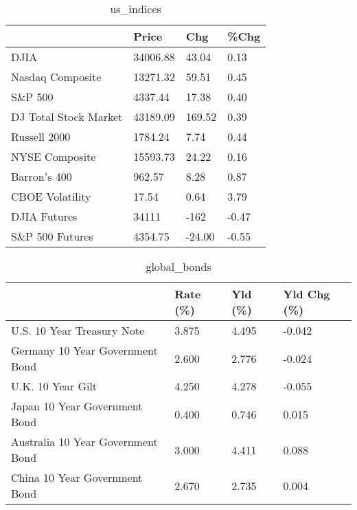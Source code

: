 \documentclass{article}%
\begin{document}
%


\begin{table}[htbp]%
\caption{us\_indices}%
\centering%
\begin{adjustbox}{width=1\textwidth}%
\begin{tabular}{llll}
\toprule
                      &    Price &    Chg &  \%Chg \\
\midrule
                 DJIA & 34006.88 &  43.04 &  0.13 \\
     Nasdaq Composite & 13271.32 &  59.51 &  0.45 \\
              S\&P 500 &  4337.44 &  17.38 &  0.40 \\
DJ Total Stock Market & 43189.09 & 169.52 &  0.39 \\
         Russell 2000 &  1784.24 &   7.74 &  0.44 \\
       NYSE Composite & 15593.73 &  24.22 &  0.16 \\
         Barron's 400 &   962.57 &   8.28 &  0.87 \\
      CBOE Volatility &    17.54 &   0.64 &  3.79 \\
         DJIA Futures &    34111 &   -162 & -0.47 \\
      S\&P 500 Futures &  4354.75 & -24.00 & -0.55 \\
\bottomrule
\end{tabular}
%
\end{adjustbox}%
\end{table}

%


\begin{table}[htbp]%
\caption{global\_bonds}%
\centering%
\begin{adjustbox}{width=1\textwidth}%
\begin{tabular}{llll}
\toprule
                                  & Rate (\%) & Yld (\%) & Yld Chg (\%) \\
\midrule
       U.S. 10 Year Treasury Note &    3.875 &   4.495 &      -0.042 \\
  Germany 10 Year Government Bond &    2.600 &   2.776 &      -0.024 \\
                U.K. 10 Year Gilt &    4.250 &   4.278 &      -0.055 \\
    Japan 10 Year Government Bond &    0.400 &   0.746 &       0.015 \\
Australia 10 Year Government Bond &    3.000 &   4.411 &       0.088 \\
    China 10 Year Government Bond &    2.670 &   2.735 &       0.004 \\
\bottomrule
\end{tabular}
%
\end{adjustbox}%
\end{table}
\end{document}
